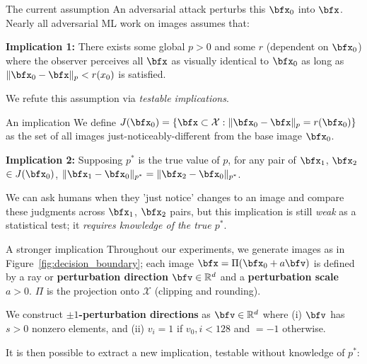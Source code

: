\documentclass[final,notheorems]{beamer}
\newlength{\colwidth}
\providecommand{\norm}[1]{\lVert#1\rVert}
\def\X{\mathcal X}
\def\R{\mathbb R}
\begin{document}
\begin{frame}[t]
\begin{columns}[t]
\begin{column}{\colwidth}
\begin{alertblock}{The current assumption}
    An adversarial attack perturbs this $\bfx_0$ into $\bfx$. Nearly all adversarial ML work on images assumes that:

    \hspace*{.1\linewidth}\colorbox{highlightbg}{\begin{minipage}{.8\linewidth}
      \textbf{Implication 1:} There exists some global $p>0$ and some $r$ (dependent on $\bfx_0$) where the observer perceives all $\bfx$ as visually identical to $\bfx_0$ as long as $\norm{\bfx_0-\bfx}_p < r(x_0)$ is satisfied.
    \end{minipage}}

    We refute this assumption via \emph{testable implications}.
  \end{alertblock}

  \begin{block}{An implication}
    We define $J(\bfx_0) = \{\bfx \subset \X : \norm{\bfx_0-\bfx}_p = r(\bfx_0)\}$ as the set of all images just-noticeably-different from the base image $\bfx_0$.

    \hspace*{.1\linewidth}\colorbox{highlightbg}{\begin{minipage}{.8\linewidth}
      \textbf{Implication 2:} Supposing $p^*$ is the true value of $p$, for any pair of $\bfx_1$, $\bfx_2$ $\in J(\bfx_0)$, $\norm{\bfx_1-\bfx_0}_{p^*} = \norm{\bfx_2-\bfx_0}_{p^*}$.
    \end{minipage}}

    We can ask humans when they 'just notice' changes to an image and compare these judgments across $\bfx_1$, $\bfx_2$ pairs, but this implication is still \emph{weak} as a statistical test; it \emph{requires knowledge of the true $p^*$}.
  \end{block}

  \begin{block}{A stronger implication}
    Throughout our experiments, we generate images as in Figure~\ref{fig:decision_boundary};
    each image $\bfx = \Pi(\bfx_0+a\bfv)$ is defined by a ray or \textbf{perturbation direction} $\bfv \in \R^d$ and a \textbf{perturbation scale} $a>0$.
    $\Pi$ is the projection onto $\X$ (clipping and rounding).

    We construct \textbf{$\pm 1$-perturbation directions} as $\bfv\in\R^d$ where
    (i) $\bfv$ has $s>0$ nonzero elements, and
    (ii) $v_i = 1$ if $v_0,i < 128$ and $=-1$ otherwise.

    It is then possible to extract a new implication, testable without knowledge of $p^*$:


\end{block}
\end{column}
\end{columns}
\end{frame}
\end{document}
